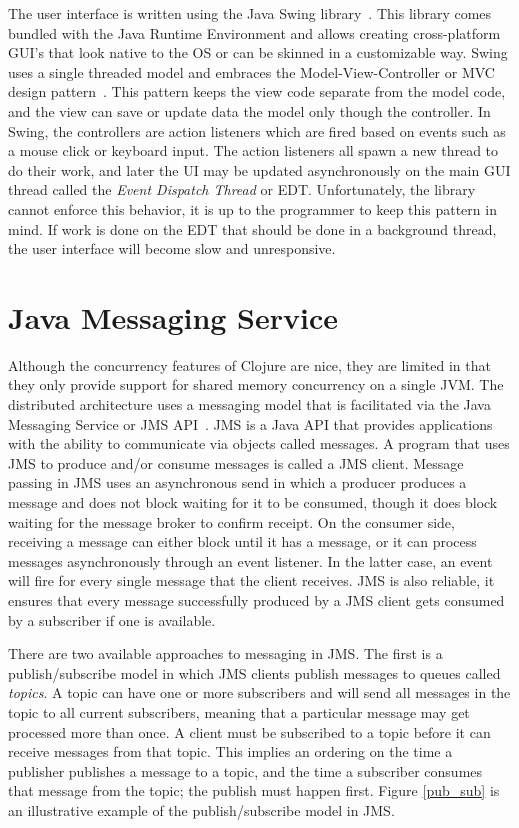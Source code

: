 The user interface is written using the Java Swing library~\cite{swing}. 
This library comes bundled with the Java Runtime Environment and allows creating cross-platform GUI's that look native to the OS or can be skinned in a customizable way. 
Swing uses a single threaded model and embraces the Model-View-Controller or MVC design pattern~\cite{mvc}. 
This pattern keeps the view code separate from the model code, and the view can save or update data the model only though the controller. 
In Swing, the controllers are action listeners which are fired based on events such as a mouse click or keyboard input. 
The action listeners all spawn a new thread to do their work, and later the UI may be updated asynchronously on the main GUI thread called the {\it Event Dispatch Thread} or EDT.
Unfortunately, the library cannot enforce this behavior, it is up to the programmer to keep this pattern in mind.
If work is done on the EDT that should be done in a background thread, the user interface will become slow and unresponsive. 

\section{Java Messaging Service}
Although the concurrency features of Clojure are nice, they are limited in that they only provide support for shared memory concurrency on a single JVM. 
The distributed architecture uses a messaging model that is facilitated via the Java Messaging Service or JMS API~\cite{jms, jms1}.
JMS is a Java API that provides applications with the ability to communicate via objects called messages.
A program that uses JMS to produce and/or consume messages is called a JMS client.
Message passing in JMS uses an asynchronous send in which a producer produces a message and does not block waiting for it to be consumed, though it does block waiting for the message broker to confirm receipt.
On the consumer side, receiving a message can either block until it has a message, or it can process messages asynchronously through an event listener.
In the latter case, an event will fire for every single message that the client receives.
JMS is also reliable, it ensures that every message successfully produced by a JMS client gets consumed by a subscriber if one is available.

There are two available approaches to messaging in JMS.
The first is a publish/subscribe model in which JMS clients publish messages to queues called {\it topics}.
A topic can have one or more subscribers and will send all messages in the topic to all current subscribers, meaning that a particular message may get processed more than once.
A client must be subscribed to a topic before it can receive messages from that topic.
This implies an ordering on the time a publisher publishes a message to a topic, and the time a subscriber consumes that message from the topic; the publish must happen first.
Figure \ref{pub_sub} is an illustrative example of the publish/subscribe model in JMS.

